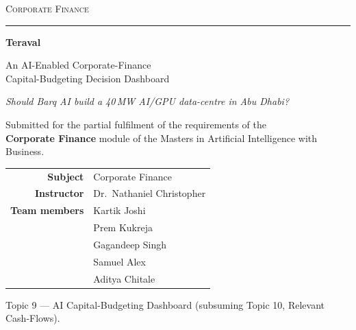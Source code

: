 \documentclass[12pt,a4paper]{article}
\begin{document}
\begin{titlepage}
\centering
\vspace*{1.2cm}
{\large\scshape Corporate Finance\par}
\vspace{0.4cm}
{\rule{0.6\textwidth}{0.4pt}\par}
\vspace{1.4cm}
{\Huge\bfseries Teraval\par}
\vspace{0.5cm}
{\Large An AI-Enabled Corporate-Finance\\[2pt] Capital-Budgeting Decision Dashboard\par}
\vspace{0.6cm}
{\large\itshape Should Barq AI build a 40\,MW AI/GPU data-centre in Abu Dhabi?\par}
\vspace{1.6cm}

{\normalsize Submitted for the partial fulfilment of the requirements of the\\
\textbf{Corporate Finance} module of the Masters in Artificial Intelligence with Business.\par}
\vspace{1.6cm}

\begin{tabular}{rl}
\textbf{Subject} & Corporate Finance\\[3pt]
\textbf{Instructor} & Dr.\ Nathaniel Christopher\\[3pt]
\textbf{Team members} & Kartik Joshi\\
 & Prem Kukreja\\
 & Gagandeep Singh\\
 & Samuel Alex\\
 & Aditya Chitale\\
\end{tabular}

\vfill
{\small Topic 9 --- AI Capital-Budgeting Dashboard (subsuming Topic 10, Relevant Cash-Flows).\par}
\end{titlepage}

\tableofcontents
\thispagestyle{empty}
\newpage

\end{document}
